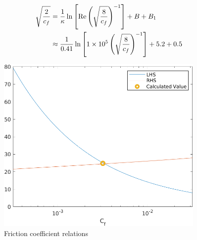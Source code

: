 \documentclass[12pt]{article}
\begin{document}
        \begin{equation} \label{eq:friction_rel}
                \begin{split}
                        \sqrt{\frac{2}{c_f}} & = \frac{1}{\kappa} \ln \left[ \text{Re} \left( \sqrt{\frac{8}{c_f}} \right)^{-1} \right] + B + B_1 \\
                        & \approx \frac{1}{0.41} \ln \left[ \num{1E5} \left( \sqrt{\frac{8}{c_f}} \right)^{-1} \right] + 5.2 + 0.5
                \end{split}
        \end{equation}

        \begin{figure}
                \centering
                \includegraphics[width=0.9\textwidth]{friction.png}
                \caption{Friction coefficient relations}
                \label{fig:friction}
        \end{figure}



\end{document}
